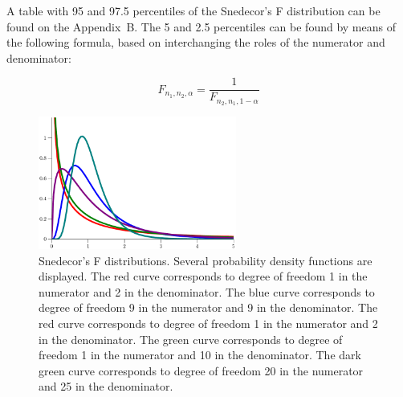 A table with 95 and 97.5 percentiles of the Snedecor's F distribution can be found on the Appendix~B.  The 5 and 2.5 percentiles can be found by means of the following formula, based on interchanging the roles of the numerator and denominator:

$$
F_{n_1,n_2,\alpha }=\frac{1}{F_{n_2,n_1,1-\alpha}} 
$$



\begin{figure}[h]
	\centering
	\includegraphics[width=0.58\textwidth]{ch_06a_inference_for_means_oi_biostat/figures/FDist/Snedecor-0}
	\caption{Snedecor's F distributions. Several probability density functions are displayed. The red curve corresponds to degree of freedom 1 in the numerator and 2 in the denominator.  The blue curve corresponds to degree of freedom 9 in the numerator and 9 in the denominator.  The red curve corresponds to degree of freedom 1 in the numerator and 2 in the denominator.  The green curve corresponds to degree of freedom 1 in the numerator and 10 in the denominator.  The dark green curve corresponds to degree of freedom 20 in the numerator and 25 in the denominator.}
	\label{SnedecorFdist}
      \end{figure}
      
